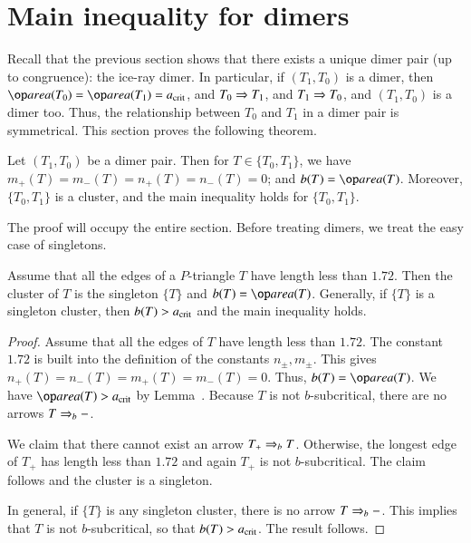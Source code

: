 \section{Main inequality for dimers}\label{sec:dimer-main}

Recall that the previous section shows that there exists a unique
dimer pair (up to congruence): the ice-ray dimer.  In particular, if
$(T_1,T_0)$ is a dimer, then $\area(T_0)=\area(T_1)=\acrit$, and
$T_0\Rightarrow T_1$, and $T_1\Rightarrow T_0$, and $(T_1,T_0)$ is a dimer too.  Thus,
the relationship between $T_0$ and $T_1$ in a dimer pair is
symmetrical.  This section proves the following theorem.

\begin{theorem} 
  Let $(T_1,T_0)$ be a dimer pair.  Then for $T\in\{T_0,T_1\}$, we have
  $m_+(T)=m_-(T) = n_+(T)=n_-(T) = 0$; and $b(T) = \area(T)$.
  Moreover, $\{T_0,T_1\}$ is a cluster, and the main inequality holds
  for $\{T_0,T_1\}$.
\end{theorem}

The proof will occupy the entire section.  Before treating dimers, we
treat the easy case of singletons.

\begin{lemma}  
  Assume that all the edges of a $P$-triangle $T$ have length less
  than $1.72$.  Then the cluster of $T$ is the singleton $\{T\}$ and
  $b(T) =\area(T)$.  Generally, if $\{T\}$ is a singleton
  cluster, then $b(T) > a_\text{crit}$ and the main inequality holds.
\end{lemma}

\begin{proof} 
  Assume that all the edges of $T$ have length less than $1.72$.  The
  constant $1.72$ is built into the definition of the constants
  $n_\pm,m_\pm$. This gives $n_+(T)=n_-(T) = m_+(T)=m_-(T)=0$.  Thus,
  $b(T)=\area(T)$.  We have $\area(T) > \acrit$ by
  Lemma~.  Because $T$ is not $b$-subcritical, there are
  no arrows $T\Rightarrow_{b} -$.

  We claim that there cannot exist an arrow $T_+\Rightarrow_{b} T$.  Otherwise,
  the longest edge of $T_+$ has length less than $1.72$ and again
  $T_+$ is not $b$-subcritical.  The claim follows and the cluster is
  a singleton.

  In general, if $\{T\}$ is any singleton cluster, there is no arrow
  $T\Rightarrow_{b} -$.  This implies that $T$ is not $b$-subcritical, so that
  $b(T) > a_\text{crit}$.  The result follows.
\end{proof}

